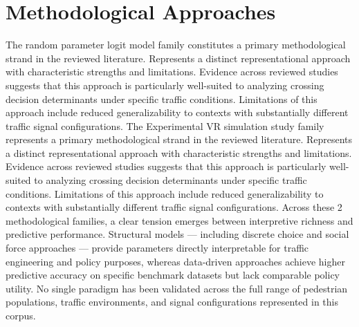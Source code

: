 \documentclass{article}
\begin{document}
\section{Methodological Approaches}
The random parameter logit model family constitutes a primary methodological strand in the reviewed literature. Represents a distinct representational approach with characteristic strengths and limitations. Evidence across reviewed studies suggests that this approach is particularly well-suited to analyzing crossing decision determinants under specific traffic conditions. Limitations of this approach include reduced generalizability to contexts with substantially different traffic signal configurations. The Experimental VR simulation study family represents a primary methodological strand in the reviewed literature. Represents a distinct representational approach with characteristic strengths and limitations. Evidence across reviewed studies suggests that this approach is particularly well-suited to analyzing crossing decision determinants under specific traffic conditions. Limitations of this approach include reduced generalizability to contexts with substantially different traffic signal configurations. Across these 2 methodological families, a clear tension emerges between interpretive richness and predictive performance. Structural models — including discrete choice and social force approaches — provide parameters directly interpretable for traffic engineering and policy purposes, whereas data-driven approaches achieve higher predictive accuracy on specific benchmark datasets but lack comparable policy utility. No single paradigm has been validated across the full range of pedestrian populations, traffic environments, and signal configurations represented in this corpus.
\end{document}

